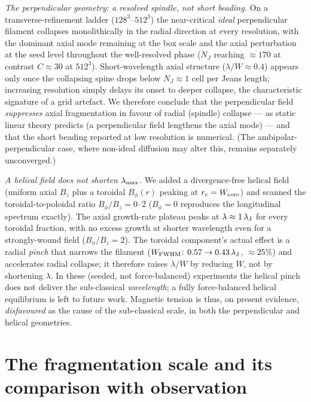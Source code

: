 \documentclass[usenatbib,twoside,twocolumn]{mnras}
\begin{document}
\emph{The perpendicular geometry: a resolved spindle, not short beading.} On a transverse-refinement ladder ($128^3$--$512^3$) the near-critical \emph{ideal} perpendicular filament collapses monolithically in the radial direction at every resolution, with the dominant axial mode remaining at the box scale and the axial perturbation at the seed level throughout the well-resolved phase ($N_J$ reaching $\approx170$ at contrast $C\approx30$ at $512^3$). Short-wavelength axial structure ($\lambda/W\approx0.4$) appears only once the collapsing spine drops below $N_J\approx1$ cell per Jeans length; increasing resolution simply delays its onset to deeper collapse, the characteristic signature of a grid artefact. We therefore conclude that the perpendicular field \emph{suppresses} axial fragmentation in favour of radial (spindle) collapse --- as static linear theory predicts (a perpendicular field lengthens the axial mode) --- and that the short beading reported at low resolution is numerical. (The ambipolar-perpendicular case, where non-ideal diffusion may alter this, remains separately unconverged.)

\emph{A helical field does not shorten $\lambda_{\rm max}$.} We added a divergence-free helical field (uniform axial $B_z$ plus a toroidal $B_\phi(r)$ peaking at $r_c=W_{\rm core}$) and scanned the toroidal-to-poloidal ratio $B_\phi/B_z=0$--$2$ ($B_\phi=0$ reproduces the longitudinal spectrum exactly). The axial growth-rate plateau peaks at $\lambda\approx1\,\lambda_{\rm J}$ for every toroidal fraction, with no excess growth at shorter wavelength even for a strongly-wound field ($B_\phi/B_z=2$). The toroidal component's actual effect is a radial \emph{pinch} that narrows the filament ($W_{\rm FWHM}$: $0.57\to0.43\,\lambda_{\rm J}$, $\approx25\%$) and accelerates radial collapse; it therefore raises $\lambda/W$ by reducing $W$, not by shortening $\lambda$. In these (seeded, not force-balanced) experiments the helical pinch does not deliver the sub-classical \emph{wavelength}; a fully force-balanced helical equilibrium is left to future work. Magnetic tension is thus, on present evidence, \emph{disfavoured} as the cause of the sub-classical scale, in both the perpendicular and helical geometries.

\section{The fragmentation scale and its comparison with observation}
\label{sec:validation_endtoend}
\end{document}
